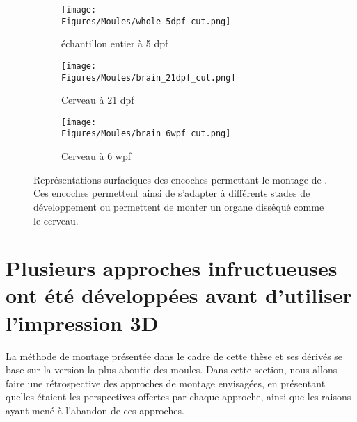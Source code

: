 \documentclass[\main/main.tex]{subfiles}
\begin{document}
\begin{figure}[h!]
    \centering
    \begin{subfigure}[b]{0.37674418604651162790697674418605\textwidth}
       \caption{
            \label{fig:formes:whole_5dpf}
            échantillon entier à 5 dpf
            }
       \centering \texttt{[image: \\Figures/Moules/whole\_5dpf\_cut.png]}
    \end{subfigure}
    \begin{subfigure}[b]{0.26162790697674418604651162790698\textwidth}
       \caption{
            \label{fig:formes:brain_21dpf}
            Cerveau à 21 dpf
            }
       \centering \texttt{[image: \\Figures/Moules/brain\_21dpf\_cut.png]}
    \end{subfigure}
    \begin{subfigure}[b]{0.26162790697674418604651162790698\textwidth}
       \caption{
            \label{fig:formes:brain_6wpf}
            Cerveau à 6 wpf
            }
       \centering \texttt{[image: \\Figures/Moules/brain\_6wpf\_cut.png]}
    \end{subfigure}
    \caption{
        \label{fig:formes}
        Représentations surfaciques des encoches permettant le montage de \pzs. Ces encoches permettent ainsi de s'adapter à différents stades de développement ou permettent de monter un organe disséqué comme le cerveau.
    }
    
\end{figure}
    
    \section{Plusieurs approches infructueuses ont été développées avant d'utiliser l'impression 3D}
 
%
La méthode de montage présentée dans le cadre de cette thèse et ses dérivés se base sur la version la plus aboutie des moules.
%
Dans cette section, nous allons faire une rétrospective des approches de montage envisagées, en présentant quelles étaient les perspectives offertes par chaque approche, ainsi que les raisons ayant mené à l'abandon de ces approches.
\end{document}
